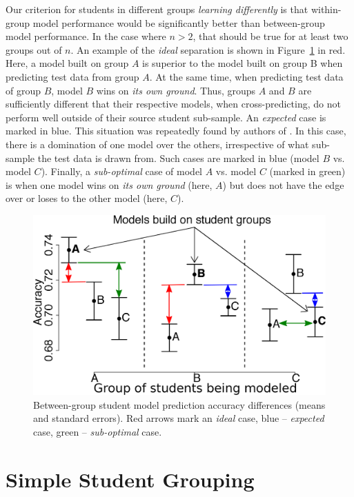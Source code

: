 \documentclass{sigchi}
\begin{document}
Our criterion for students in different groups \textit{learning differently} is that within-group model performance would be significantly better than between-group model performance. In the case where $n>2$, that should be true for at least two groups out of $n$. An example of the \textit{ideal} separation is shown in Figure~\ref{fig:graph-predict} in red. Here, a model built on group $A$ is superior to the model built on group B when predicting test data from group $A$. At the same time, when predicting test data of group $B$, model $B$ wins on \textit{its own ground}. Thus, groups $A$ and $B$ are sufficiently different that their respective models, when cross-predicting, do not perform well outside of their source student sub-sample. An \textit{expected} case is marked in blue. This situation was repeatedly found by authors of \cite{yudelson2014bdbbd}. In this case, there is a domination of one model over the others, irrespective of what sub-sample the test data is drawn from. Such cases are marked in blue (model $B$ vs. model $C$). Finally, a \textit{sub-optimal} case of model $A$ vs. model $C$ (marked in green) is when one model wins on \textit{its own ground} (here, $A$) but does not have the edge over or loses to the other model (here, $C$).

\begin{figure}[thb]
\centering
   \includegraphics[width=0.75\columnwidth]{figures/cross-predict_examples.eps}
\caption{Between-group student model prediction accuracy differences (means and standard errors). Red arrows mark an \textit{ideal} case, blue -- \textit{expected} case, green -- \textit{sub-optimal} case.}%
\label{fig:graph-predict}
\end{figure}

\section{Simple Student Grouping}
\end{document}
